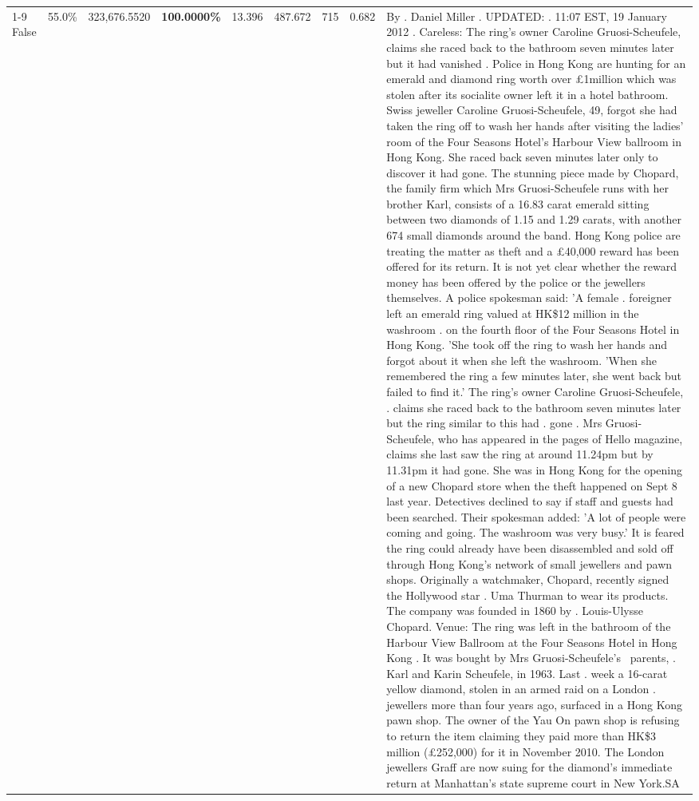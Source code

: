 \begin{table}[H]
\begin{tabular}{lllrlllll}
\cline{1-9}
False & 55.0\% & 323,676.5520 & \bfseries \color{red} 100.0000\% & 13.396 & 487.672 & 715 & 0.682 & By . Daniel Miller . UPDATED: . 11:07 EST, 19 January 2012 . Careless: The ring's owner Caroline Gruosi-Scheufele, claims she raced back to the bathroom seven minutes later but it had vanished . Police in Hong Kong are hunting for an emerald and diamond ring worth over £1million which was stolen after its socialite owner left it in a hotel bathroom. Swiss jeweller Caroline Gruosi-Scheufele, 49, forgot she had taken the ring off to wash her hands after visiting the ladies' room of the Four Seasons Hotel's Harbour View ballroom in Hong Kong. She raced back seven minutes later only to discover it had gone. The stunning piece made by Chopard, the family firm which Mrs Gruosi-Scheufele runs with her brother Karl, consists of a 16.83 carat emerald sitting between two diamonds of 1.15 and 1.29 carats, with another 674 small diamonds around the band. Hong Kong police are treating the matter as theft and a £40,000 reward has been offered for its return. It is not yet clear whether the reward money has been offered by the police or the jewellers themselves. A police spokesman said: 'A female . foreigner left an emerald ring valued at HK\$12 million in the washroom . on the fourth floor of the Four Seasons Hotel in Hong Kong. 'She took off the ring to wash her hands and forgot about it when she left the washroom. 'When she remembered the ring a few minutes later, she went back but failed to find it.' The ring's owner Caroline Gruosi-Scheufele, . claims she raced back to the bathroom seven minutes later but the ring similar to this had . gone . Mrs Gruosi-Scheufele, who has appeared in the pages of Hello magazine, claims she last saw the ring at around 11.24pm but by 11.31pm it had gone. She was in Hong Kong for the opening of a new Chopard store when the theft happened on Sept 8 last year. Detectives declined to say if staff and guests had been searched. Their spokesman added: 'A lot of people were coming and going. The washroom was very busy.' It is feared the ring could already have been disassembled and sold off through Hong Kong's network of small jewellers and pawn shops. Originally a watchmaker, Chopard, recently signed the Hollywood star . Uma Thurman to wear its products. The company was founded in 1860 by . Louis-Ulysse Chopard. Venue: The ring was left in the bathroom of the Harbour View Ballroom at the Four Seasons Hotel in Hong Kong . It was bought by Mrs Gruosi-Scheufele's  parents, . Karl and Karin Scheufele, in 1963. Last . week a 16-carat yellow diamond, stolen in an armed raid on a London . jewellers more than four years ago, surfaced in a Hong Kong pawn shop. The owner of the Yau On pawn shop is refusing to return the item claiming they paid more than HK\$3 million (£252,000) for it in November 2010. The London jewellers Graff are now suing for the diamond’s immediate return at Manhattan’s state supreme court in New York.SA \\

\end{tabular}
\end{table}
